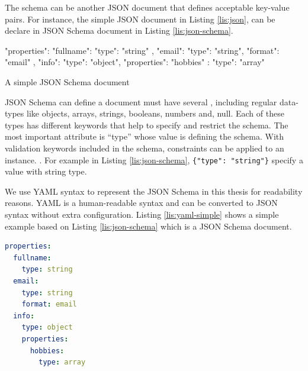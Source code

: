 The schema can be another JSON document that defines acceptable key-value pairs.
For instance, the simple JSON document in Listing \ref{lis:json}, can be declare in JSON Schema document in Listing \ref{lis:json-schema}.

\FloatBarrier
\begin{code}
\begin{json}
{
    "properties": {
        "fullname": {
            "type": "string"
        },
        "email": {
            "type": "string",
            "format": "email"
        },
        "info": {
            "type": "object",
            "properties": {
                "hobbies" : {
                    "type": "array"
                }
            }
        }        
    }
}
\end{json}
\caption{A simple JSON Schema document}
\label{lis:json-schema}
\end{code}
\FloatBarrier

JSON Schema can define a document must have several , including regular data-types like objects, arrays, strings, booleans, numbers and, null. Each of these types has different keywords that help to specify and restrict the schema. The most important attribute is “type” whose value is defining the schema. With validation keywords included in the schema, constraints can be applied to an instance. \cite{json-model}. For example in Listing \ref{lis:json-schema}, \lstinline[basicstyle=\ttfamily]|{"type": "string"}| specify a value with string type.

We use YAML syntax to represent the JSON Schema in this thesis for readability reasons. YAML is a human-readable syntax and can be converted to JSON syntax without extra configuration. Listing \ref{lis:yaml-simple} shows a simple example based on Listing \ref{lis:json-schema} which is a JSON Schema document.


\lstset{
  label=lis:yaml-simple, caption=Example of expressing JSON Schema in YAML syntax., 
}
\begin{lstlisting}[language=yaml]
properties:
  fullname:
    type: string
  email:
    type: string
    format: email
  info:
    type: object
    properties:
      hobbies:
        type: array
\end{lstlisting}

